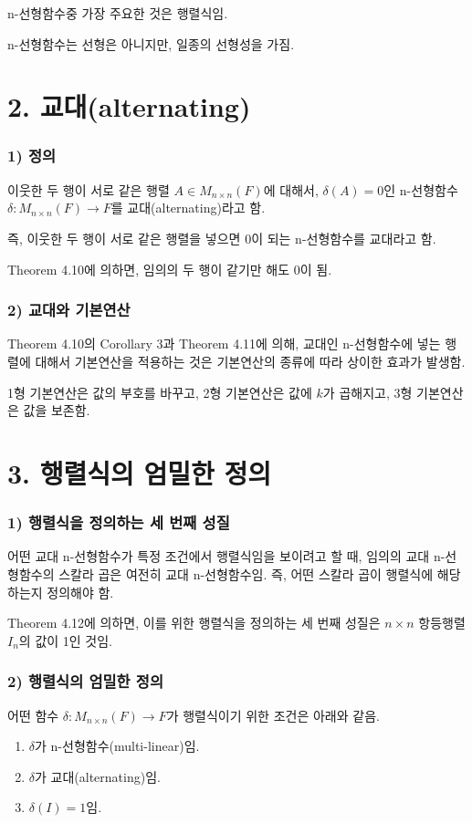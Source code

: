 n-선형함수중 가장 주요한 것은 행렬식임.

n-선형함수는 선형은 아니지만, 일종의 선형성을 가짐.\\


\section*{2. 교대(alternating)}
\subsubsection*{1) 정의\\}
\begin{DEF}
이웃한 두 행이 서로 같은 행렬 $A \in M_{n \times n}(F)$에 대해서, $\delta(A)=0$인 n-선형함수 $\delta:M_{n \times n}(F) \rightarrow F$를 교대(alternating)라고 함.
\end{DEF}

즉, 이웃한 두 행이 서로 같은 행렬을 넣으면 0이 되는 n-선형함수를 교대라고 함.

Theorem 4.10에 의하면, 임의의 두 행이 같기만 해도 0이 됨.

\subsubsection*{2) 교대와 기본연산}
Theorem 4.10의 Corollary 3과 Theorem 4.11에 의해, 교대인 n-선형함수에 넣는 행렬에 대해서 기본연산을 적용하는 것은 기본연산의 종류에 따라 상이한 효과가 발생함.

1형 기본연산은 값의 부호를 바꾸고, 2형 기본연산은 값에 $k$가 곱해지고, 3형 기본연산은 값을 보존함.


\newpage


\section*{3. 행렬식의 엄밀한 정의}
\subsubsection*{1) 행렬식을 정의하는 세 번째 성질}
어떤 교대 n-선형함수가 특정 조건에서 행렬식임을 보이려고 할 때, 임의의 교대 n-선형함수의 스칼라 곱은 여전히 교대 n-선형함수임. 즉, 어떤 스칼라 곱이 행렬식에 해당하는지 정의해야 함.

Theorem 4.12에 의하면, 이를 위한 행렬식을 정의하는 세 번째 성질은 $n \times n$ 항등행렬 $I_n$의 값이 1인 것임.

\subsubsection*{2) 행렬식의 엄밀한 정의\\}
\begin{DEF}
어떤 함수 $\delta:M_{n \times n}(F) \rightarrow F$가 행렬식이기 위한 조건은 아래와 같음.

\begin{enumerate}
    \item $\delta$가 n-선형함수(multi-linear)임.
    \item $\delta$가 교대(alternating)임.
    \item $\delta(I)=1$임.
\end{enumerate}
\end{DEF}

